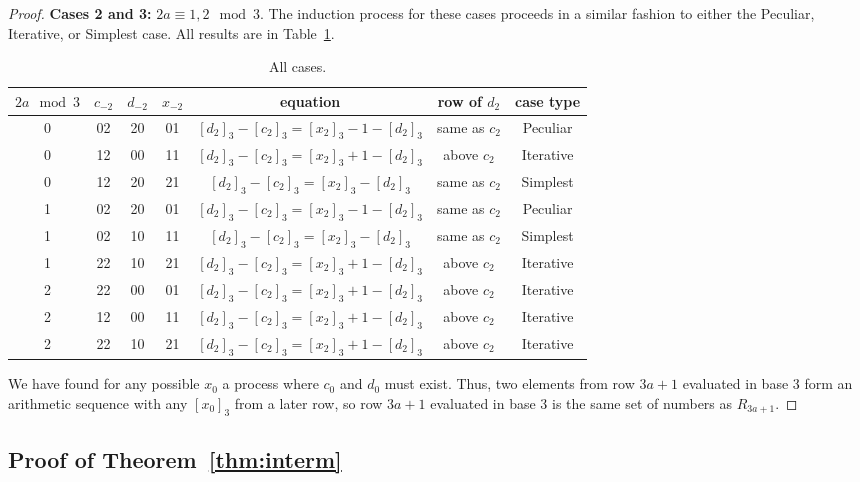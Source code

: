 \documentclass[12pt,reqno]{article}
\theoremstyle{plain}
\theoremstyle{definition}
\theoremstyle{remark}
\begin{document}
\begin{proof}
\textbf{Cases 2 and 3:} $2a \equiv 1, 2 \mod{3}$. The induction process for these cases proceeds in a similar fashion to either the Peculiar, Iterative, or Simplest case. All results are in Table~\ref{table:allcases}.

\begin{table}[ht!]
\begin{center}
\begin{tabular}{|c|c|c|c|c|c|c|}
\hline
 $2a \mod{3}$  & $c_{-2}$ & $d_{-2}$& $x_{-2}$ & equation & row of $d_2$ & case type \\
 \hline
 0 &  02 &20  & 01 & $[d_2]_3-[c_2]_3 = [x_2]_3 - 1 - [d_2]_3$&  same as $c_2$ & Peculiar \\
 \hline
 0 &  12 &00  & 11 & $[d_2]_3-[c_2]_3 = [x_2]_3+1 - [d_2]_3$&  above $c_2$ & Iterative \\
 \hline
  0 &  12 &20  & 21 & $[d_2]_3-[c_2]_3 = [x_2]_3 - [d_2]_3$&  same as $c_2$ & Simplest \\
 \hline
  1 &  02 &20  & 01 & $[d_2]_3-[c_2]_3 = [x_2]_3 - 1 - [d_2]_3$&  same as $c_2$ & Peculiar \\
 \hline
  1 &  02 &10  & 11 & $[d_2]_3-[c_2]_3 = [x_2]_3 - [d_2]_3$&  same as $c_2$ & Simplest \\
 \hline
  1 &  22 & 10  & 21 & $[d_2]_3-[c_2]_3 = [x_2]_3+1 - [d_2]_3$&  above $c_2$ & Iterative \\
 \hline
  2 &  22 &00  & 01 & $[d_2]_3-[c_2]_3 = [x_2]_3+1 - [d_2]_3$&  above $c_2$ & Iterative \\
 \hline
   2 &  12 &00  & 11 & $[d_2]_3-[c_2]_3 = [x_2]_3+1 - [d_2]_3$&  above $c_2$ & Iterative \\
 \hline
   2 &  22 &10  & 21 & $[d_2]_3-[c_2]_3 = [x_2]_3+1 - [d_2]_3$&  above $c_2$ & Iterative \\
 \hline
\end{tabular}
\caption{All cases.}
\label{table:allcases}
\end{center}
\end{table}

We have found for any possible $x_0$ a process where $c_0$ and $d_0$ must exist. Thus, two elements from row $3a+1$ evaluated in base 3 form an arithmetic sequence with any $[x_0]_3$ from a later row, so row $3a+1$ evaluated in base 3 is the same set of numbers as $R_{3a+1}$.
\end{proof}



\subsection{Proof of Theorem~\ref{thm:interm}}
\end{document}
